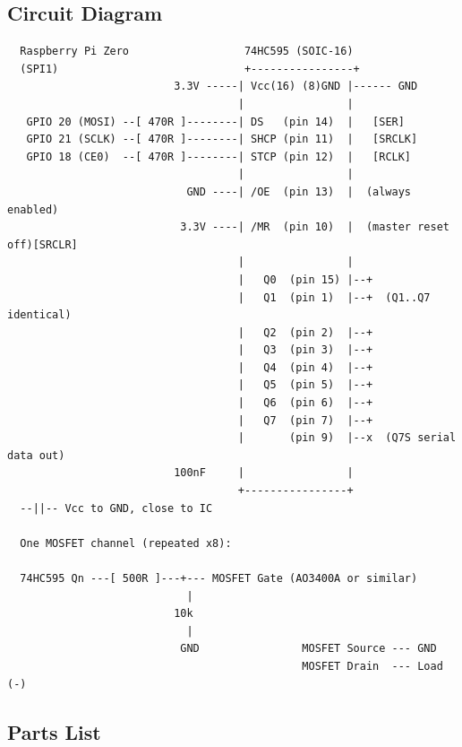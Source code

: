 \subsection{Circuit Diagram}

\begin{verbatim}
  Raspberry Pi Zero                  74HC595 (SOIC-16)
  (SPI1)                             +----------------+
                          3.3V -----| Vcc(16) (8)GND |------ GND
                                    |                |
   GPIO 20 (MOSI) --[ 470R ]--------| DS   (pin 14)  |   [SER]
   GPIO 21 (SCLK) --[ 470R ]--------| SHCP (pin 11)  |   [SRCLK]
   GPIO 18 (CE0)  --[ 470R ]--------| STCP (pin 12)  |   [RCLK]
                                    |                |
                            GND ----| /OE  (pin 13)  |  (always enabled)
                           3.3V ----| /MR  (pin 10)  |  (master reset off)[SRCLR]
                                    |                |
                                    |   Q0  (pin 15) |--+
                                    |   Q1  (pin 1)  |--+  (Q1..Q7 identical)
                                    |   Q2  (pin 2)  |--+
                                    |   Q3  (pin 3)  |--+
                                    |   Q4  (pin 4)  |--+
                                    |   Q5  (pin 5)  |--+
                                    |   Q6  (pin 6)  |--+
                                    |   Q7  (pin 7)  |--+
                                    |       (pin 9)  |--x  (Q7S serial data out)
                          100nF     |                |
                                    +----------------+
  --||-- Vcc to GND, close to IC
 
  One MOSFET channel (repeated x8):

  74HC595 Qn ---[ 500R ]---+--- MOSFET Gate (AO3400A or similar)
                            |
                          10k
                            |
                           GND                MOSFET Source --- GND
                                              MOSFET Drain  --- Load (-)
\end{verbatim}

\subsection{Parts List}

